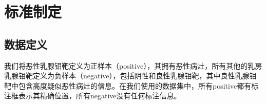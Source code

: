 \begin{comment}
\begin{table}[!htbp]
	\bicaption{天肿数据集划分}{tianzhong data set partition}
    \label{tab:data_set_split}
    \centering
    \footnotesize%
    \setlength{\tabcolsep}{4pt}%
    \renewcommand{\arraystretch}{1.2}%
    \begin{tabular}{c|c|c|c|c|c}
        \hline       
        \multirow{2}{*}{} & \multicolumn{2}{|c|}{病例数} & \multicolumn{3}{c}{图片数}\\
        \cline{2-6}
         &恶性病例数 &正常病例数 &恶性图片数 &正常图片数 &带有标注的恶性图片数\\
        \hline
        训练集 &244 &334 &1010 &1326 &478 \\
        \hline
        测试集 &60 &83 &244 &328 &120\\
        \hline
    \end{tabular}
\end{table}
\end{comment}
\begin{comment}
\begin{table}[!htbp]
    \bicaption{数据集划分}{Data set partition}
    \label{tab:data_set_split}
    \centering
    \footnotesize%
    \setlength{\tabcolsep}{4pt}%
    \renewcommand{\arraystretch}{1.2}%
    \begin{tabular}{ccc}
        \hline
        数据集& 病例数：恶性病例数+正常病例数& 图片数：恶性病例图片数（标注框）+正常病例图片数\\
        \hline
        训练集& 578：244 + 334& 2336：1010（478）+1326\\
		测试集& 143：60 + 83& 572：244（120）+328\\
        \hline
    \end{tabular}
\end{table}
\end{comment}

\section{标准制定}
\subsection{数据定义}
我们将恶性乳腺钼靶定义为正样本（positive），其拥有恶性病灶，所有其他的乳房乳腺钼靶定义为负样本（negative），包括阴性和良性乳腺钼靶，其中良性乳腺钼靶中包含高度疑似恶性病灶的信息。在我们使用的数据集中，所有positive都有标注框表示其精确位置，所有negative没有任何标注信息。

